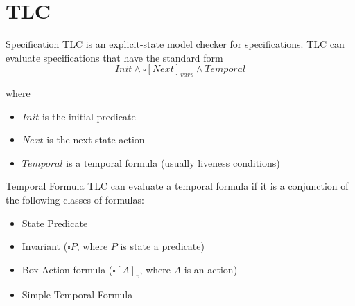 
\section[image=bgphoto_cut]{TLC}
\begin{frame}[plain]{}
    \sectionpage
\end{frame}

\begin{frame}{Specification}
    TLC is an explicit-state model checker for \tlap specifications.
    TLC can evaluate specifications that have the standard form
    \[
        Init \land \square \left[ Next \right]_{vars} \land Temporal
    \]

    where
    \begin{itemize}
        \item $Init$ is the initial predicate
        \item $Next$ is the next-state action
        \item $Temporal$ is a temporal formula (usually liveness conditions)
    \end{itemize}

\end{frame}

\begin{frame}{Temporal Formula}
    TLC can evaluate a temporal formula if it is a conjunction of the following classes of formulas:
    \begin{itemize}
        \item State Predicate
        \item Invariant ($\square P$, where $P$ is state a predicate)
        \item Box-Action formula ($\square[A]_v$, where $A$ is an action)
        \item Simple Temporal Formula
    \end{itemize}
\end{frame}

